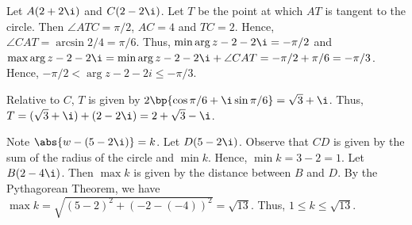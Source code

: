 \begin{solution}
\begin{center}
    \end{center}

    \begin{ppart}
        Let $A(2 + 2\i)$ and $C(2 - 2\i)$. Let $T$ be the point at which $AT$ is tangent to the circle. Then $\angle ATC = \pi/2$, $AC = 4$ and $TC = 2$. Hence, $\angle CAT = \arcsin{2/4} = \pi/6$. Thus, $\min \arg{z - 2 - 2\i} = -\pi/2$ and $\max \arg{z - 2 - 2\i} = \min \arg{z - 2 - 2\i} + \angle CAT = -\pi/2 + \pi/6 = -\pi/3$. Hence, $-\pi/2 < \arg{z - 2 - 2i} \leq -\pi/3$.
    \end{ppart}
    \begin{ppart}
        Relative to $C$, $T$ is given by $2 \bp{\cos{\pi/6} + \i\sin{\pi/6}} = \sqrt3 + \i$. Thus, $T = (\sqrt 3 + \i) + (2 - 2\i) = 2 + \sqrt3 - \i$.
    \end{ppart}

    Note $\abs{w - (5 - 2\i)} = k$. Let $D(5 - 2\i)$. Observe that $CD$ is given by the sum of the radius of the circle and $\min k$. Hence, $\min k = 3 - 2 = 1$. Let $B(2 - 4\i)$. Then $\max k$ is given by the distance between $B$ and $D$. By the Pythagorean Theorem, we have $\max k = \sqrt{(5-2)^2 + (-2-(-4))^2} = \sqrt{13}$. Thus, $1 \leq k \leq \sqrt{13}$.
\end{solution}